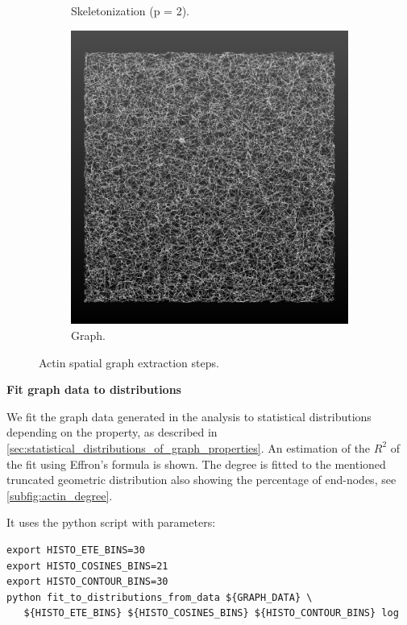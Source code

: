 \begin{figure}[H]
\begin{subfigure}{0.5\textwidth}
    \caption{Skeletonization (p = 2).}
    \label{subfig:actin_skeleton}
  \end{subfigure}%
  \begin{subfigure}{0.5\textwidth}
    \centering
    \includegraphics[width=0.9\linewidth]{Figures/chapter-image/pipeline_screenshots/actin_graph.png}
    \caption{Graph.}
    \label{fig:actin_graph}
  \end{subfigure}%
  \caption{Actin spatial graph extraction steps.}
  \label{fig:actin_all}
\end{figure}

\textbf{Fit graph data to distributions}

We fit the graph data generated in the analysis to statistical distributions depending on the property, as described in \autoref{sec:statistical_distributions_of_graph_properties}.
An estimation of the $R^2$ of the fit using Effron's formula \cite{lindstrom_finite-strain_2013} is shown.
The degree is fitted to the mentioned truncated geometric distribution also showing the percentage of end-nodes, see \autoref{subfig:actin_degree}.

It uses the python script   \cite{phcerdan_fit_to_distribution_from_data_2018} with parameters:

\begin{verbatim}
export HISTO_ETE_BINS=30
export HISTO_COSINES_BINS=21
export HISTO_CONTOUR_BINS=30
python fit_to_distributions_from_data ${GRAPH_DATA} \
   ${HISTO_ETE_BINS} ${HISTO_COSINES_BINS} ${HISTO_CONTOUR_BINS} log
\end{verbatim}

